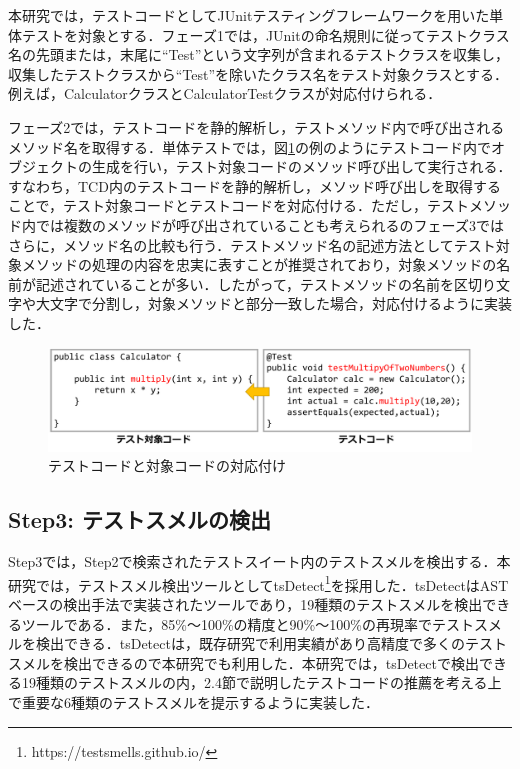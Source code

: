 \documentclass[12pt]{jarticle} %
\begin{document}
本研究では，テストコードとしてJUnitテスティングフレームワークを用いた単体テストを対象とする．フェーズ1では，JUnitの命名規則に従ってテストクラス名の先頭または，末尾に``Test''という文字列が含まれるテストクラスを収集し，収集したテストクラスから``Test''を除いたクラス名をテスト対象クラスとする．例えば，CalculatorクラスとCalculatorTestクラスが対応付けられる．

フェーズ2では，テストコードを静的解析し，テストメソッド内で呼び出されるメソッド名を取得する．単体テストでは，図\ref{map}の例のようにテストコード内でオブジェクトの生成を行い，テスト対象コードのメソッド呼び出して実行される．すなわち，TCD内のテストコードを静的解析し，メソッド呼び出しを取得することで，テスト対象コードとテストコードを対応付ける．ただし，テストメソッド内では複数のメソッドが呼び出されていることも考えられるのフェーズ3ではさらに，メソッド名の比較も行う．テストメソッド名の記述方法としてテスト対象メソッドの処理の内容を忠実に表すことが推奨されており，対象メソッドの名前が記述されていることが多い\cite{b22}．したがって，テストメソッドの名前を区切り文字や大文字で分割し，対象メソッドと部分一致した場合，対応付けるように実装した．

\begin{figure}[htbp]
  \begin{center}
    \includegraphics[clip,width=15cm]{pic/mapping.pdf}
    \caption{テストコードと対象コードの対応付け}
    \label{map}
  \end{center}
\end{figure}

\subsection{Step3: テストスメルの検出}

Step3では，Step2で検索されたテストスイート内のテストスメルを検出する．本研究では，テストスメル検出ツールとして{\sf tsDetect}\footnote{https://testsmells.github.io/}\cite{Peruma}を採用した．{\sf tsDetect}はASTベースの検出手法で実装されたツールであり，19種類のテストスメルを検出できるツールである．また，85\%〜100\%の精度と90\%〜100\%の再現率でテストスメルを検出できる．{\sf tsDetect}は，既存研究で利用実績があり高精度で多くのテストスメルを検出できるので本研究でも利用した．本研究では，{\sf tsDetect}で検出できる19種類のテストスメルの内，2.4節で説明したテストコードの推薦を考える上で重要な6種類のテストスメルを提示するように実装した．
\end{document}
